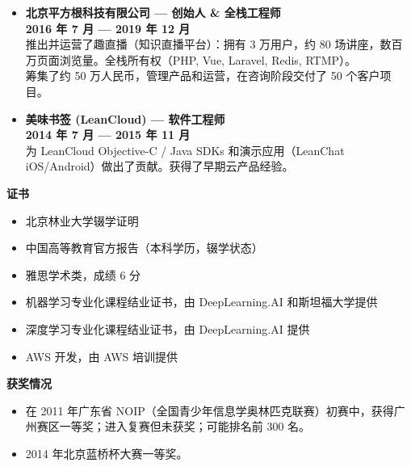 \documentclass[11pt, a4paper]{latex/awesome-cv}
\begin{document}
\begin{itemize}
    \item \textbf{北京平方根科技有限公司 — 创始人 \& 全栈工程师} \\
    \textbf{2016 年 7 月 — 2019 年 12 月} \\
    推出并运营了趣直播（知识直播平台）：拥有 3 万用户，约 80 场讲座，数百万页面浏览量。全栈所有权（PHP, Vue, Laravel, Redis, RTMP）。\\
    筹集了约 50 万人民币，管理产品和运营，在咨询阶段交付了 50 个客户项目。

    \item \textbf{美味书签 (LeanCloud) — 软件工程师} \\
    \textbf{2014 年 7 月 — 2015 年 11 月} \\
    为 LeanCloud Objective-C / Java SDKs 和演示应用（LeanChat iOS/Android）做出了贡献。获得了早期云产品经验。
\end{itemize}

\textbf{证书}

\begin{itemize}
    \item 北京林业大学辍学证明
    \item 中国高等教育官方报告（本科学历，辍学状态）
    \item 雅思学术类，成绩 6 分
    \item 机器学习专业化课程结业证书，由 DeepLearning.AI 和斯坦福大学提供
    \item 深度学习专业化课程结业证书，由 DeepLearning.AI 提供
    \item AWS 开发，由 AWS 培训提供
\end{itemize}

\textbf{获奖情况}

\begin{itemize}
    \item 在 2011 年广东省 NOIP（全国青少年信息学奥林匹克联赛）初赛中，获得广州赛区一等奖；进入复赛但未获奖；可能排名前 300 名。
    \item 2014 年北京蓝桥杯大赛一等奖。
\end{itemize}
\end{document}
